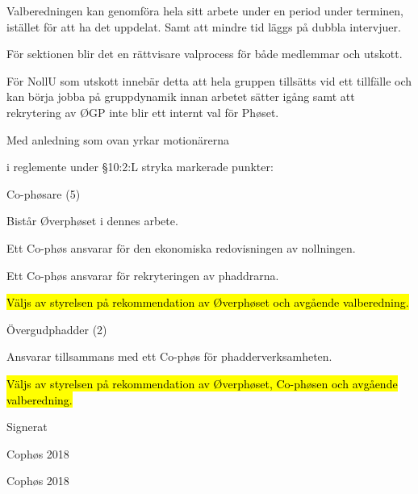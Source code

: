 \documentclass[../_main/handlingar.tex]{subfiles}
\begin{document}
\begin{dashlist}
    \item Valberedningen kan genomföra hela sitt arbete under en period under terminen, istället
    för att ha det uppdelat. Samt att mindre tid läggs på dubbla intervjuer.
    \item För sektionen blir det en rättvisare valprocess för både medlemmar och utskott.
    \item För NollU som utskott innebär detta att hela gruppen tillsätts vid ett tillfälle och kan börja
    jobba på gruppdynamik innan arbetet sätter igång samt att rekrytering av ØGP inte blir
    ett internt val för Phøset.
\end{dashlist}
\newpage
Med anledning som ovan yrkar motionärerna
\begin{attsatser}
\att i reglemente under \S10:2:L stryka markerade punkter:

\begin{emptylist}
    \item Co-phøsare (5)
        \begin{dashlist}
          \item Bistår Øverphøset i dennes arbete.
          \item Ett Co-phøs ansvarar för den ekonomiska redovisningen av nollningen.
          \item Ett Co-phøs ansvarar för rekryteringen av phaddrarna.
          \item \hl{Väljs av styrelsen på rekommendation av Øverphøset och avgående valberedning.}
        \end{dashlist}
    \item Övergudphadder (2)
        \begin{dashlist}
          \item Ansvarar tillsammans med ett Co-phøs för phadderverksamheten.
          \item \hl{Väljs av styrelsen på rekommendation av Øverphøset, Co-phøsen och avgående
          valberedning.}
        \end{dashlist}
\end{emptylist}
\changenote
\end{attsatser}
\begin{signatures}{2}
    Signerat
    \signature{Edvard Carlsson}{Cophøs 2018}
    \signature{Sonja Kenari}{Cophøs 2018}
\end{signatures}
\end{document}

